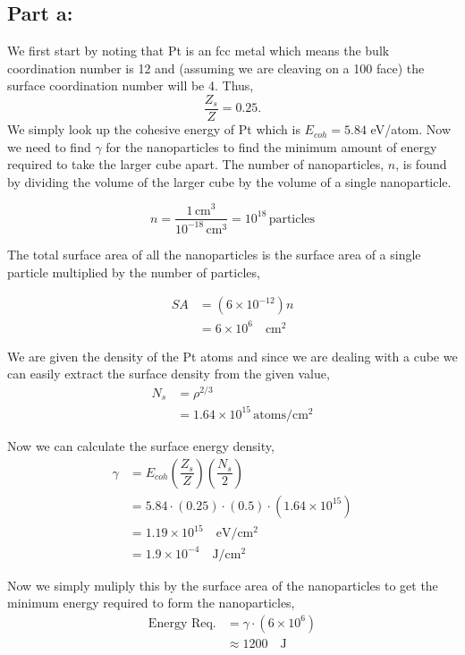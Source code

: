 \documentclass[12pt]{article}
\renewcommand{\=}[1]{\stackrel{#1}{=}} %
\theoremstyle{definition}
\theoremstyle{remark}
\begin{document}
 
 \subsection*{Part a:}
 
 We first start by noting that Pt is an fcc metal which means the bulk coordination number is 12 and (assuming we are cleaving on a {100} face) the surface coordination number will be 4. Thus,
 \[
 	\dfrac{Z_s}{Z} = 0.25.
 \]
We simply look up the cohesive energy of Pt which is $E_{coh} = 5.84$ eV/atom. Now we need to find $\gamma$ for the nanoparticles to find the minimum amount of energy required to take the larger cube apart. The number of nanoparticles, $n$, is found by dividing the volume of the larger cube by the volume of a single nanoparticle.

\[
	n = \dfrac{1 \,\text{cm}^3}{10^{-18}\,\text{cm}^3} = 10^{18} \,\text{particles}
\] 

The total surface area of all the nanoparticles is the surface area of a single particle multiplied by the number of particles,

\begin{align*}
	SA &= \left(6\times 10^{-12}\right)n\\[3mm]
		&= 6 \times 10^6 \quad \text{cm}^2
\end{align*}

We are given the density of the Pt atoms and since we are dealing with a cube we can easily extract the surface density from the given value,
\begin{align*}
	N_s &= \rho^{2/3}\\
		&= 1.64\times 10^{15} \, \text{atoms/cm$^2$}
\end{align*}

Now we can calculate the surface energy density,
\begin{align*}
	\gamma &= E_{coh} \left(\dfrac{Z_s}{Z}\right)\left(\dfrac{N_s}{2}\right)\\[3mm]
		&= 5.84 \cdot (0.25) \cdot (0.5) \cdot \left(1.64\times 10^{15}\right)\\[3mm]
		&= 1.19 \times 10^{15} \quad \text{eV/cm$^2$}\\[3mm]
		&= 1.9 \times 10^{-4} \quad \text{J/cm$^2$}
\end{align*}

Now we simply muliply this by the surface area of the nanoparticles to get the minimum energy required to form the nanoparticles,
\begin{align*}
 \text{Energy Req.} &= \gamma \cdot \left(6\times 10^6\right)\\[3mm]
 	&\boxed{\approx 1200 \quad \text{J}}
\end{align*}
\end{document}

